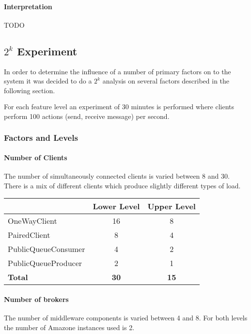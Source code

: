 \documentclass[milestone1.tex]{subfiles}
\begin{document}
\paragraph{Interpretation}

TODO

\subsection{$2^k$ Experiment}
In order to determine the influence of a number of primary factors on to the system it was decided to do a $2^k$ analysis on several factors described in the following section.

For each feature level an experiment of 30 minutes is performed where clients perform 100 actions (send, receive message) per second.

\subsubsection{Factors and Levels}

\paragraph{Number of Clients}
The number of simultaneously connected clients is varied between 8 and 30. There is a mix of different clients which produce slightly different types of load.

\begin{tabular}{|l|c|c|}
\hline 
 & Lower Level & Upper Level \\ 
\hline 
OneWayClient & 16 & 8  \\ 
\hline 
PairedClient & 8 & 4 \\ 
\hline 
PublicQueueConsumer & 4 & 2 \\ 
\hline 
PublicQueueProducer & 2 & 1 \\ 
\hline 
\textbf{Total}  & \textbf{30} & \textbf{15} \\
\hline 
\end{tabular} 

\paragraph{Number of brokers}

The number of middleware components is varied between 4 and 8. For both levels the number of Amazone instances used is 2.
\end{document}
